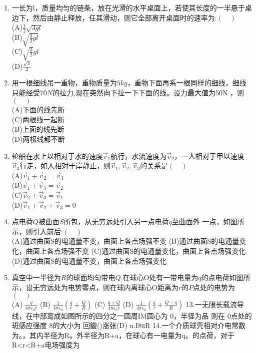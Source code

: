 \begin{enumerate}
\item 一长为l，质量均匀的链条，放在光滑的水平桌面上，若使其长度的一半悬于桌边下，然后由静止释放，任其滑动，则它全部离开桌面时的速率为:$(\quad)$\\
(A)$\frac{1}{2}\sqrt{3gl}$\\
(B)$\sqrt{\frac{3}{2}gl}$\\
(C)$\sqrt{\frac{3}{2}}gl$\\
(D)$\frac{\sqrt{3}}{2}$
\item 用一根细线吊一重物，重物质量为$5kg$，重物下面再系一根同样的细线，细线只能经受$70N$的拉力,现在突然向下拉一下下面的线。设力最大值为50N ，则$(\quad)$\\
(A)下面的线先断\\
(C)两根线一起断\\
(B)上面的线先断\\
(D)两根线都不断
\item 轮船在水上以相对于水的速度$\vec v_1$航行，水流速度为$\vec v_2$，一人相对于甲以速度$\vec v_3$行走，如人相对于岸静止，则$\vec v_1,\vec v_2,\vec v_3$的关系是$(\quad)$\\
(A)$\vec v_1+\vec v_2=\vec v_3$\\
(B)$\vec v_1+\vec v_3=\vec v_2$\\
(C)$\vec v_2+\vec v_3=\vec v_1$\\
(D)$\vec v_1+\vec v_2+\vec v_3=0$
\item 点电荷$Q$被曲面$S$所包，从无穷远处引入另一点电荷$q$至曲面外
一点，如图所示，则引入前后:$(\quad)$\\
(A)通过曲面S的电通量不变，曲面上各点场强不变
(B)通过曲面S的电通量变化，曲面上各点场强不变
(C)通过曲面S的电通量变化，曲面上各点场强变化
(D)通过曲面S的电通量不变，曲面上各点场强变化
\item 真空中一半径为$R$的球面均匀带电$Q$,在球心O处有一带电量为$q$的点电荷如图所示，设无穷远处为电势零点，则在球内离球心O距离为$r$的$P$点处的电势为$(\quad)$\\
(A) $\frac{q}{4\pi \varepsilon_0 r}$
(B) $\frac{1}{4\pi \varepsilon_0}(\frac{q}{r}+\frac{Q}{R})$
(C) $\frac{q+Q}{4\pi \varepsilon_0 r}$
(D) $\frac{1}{4\pi \varepsilon_0}(\frac{q}{r}+\frac{Q-q}{R})$
13.一无限长载流导线，在中部鸾成如图所示的四分之一圆周IM圆心为 0，半径为品 则在 0点处的斑感应强度 8的大小为
回鏇()涨张(D)
u.I8πR
14.一个介质球壳相对介电常数为。，其内半径为R。外半径为R+a，在球心有一电量为q。的点荷，对于R<r<R+a电场强度为
\end{enumerate}